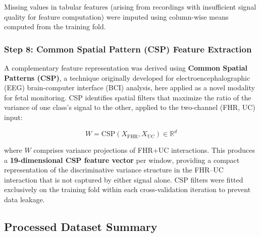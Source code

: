\documentclass[conference]{IEEEtran}
\begin{document}
Missing values in tabular features (arising from recordings with insufficient
signal quality for feature computation) were imputed using column-wise means
computed from the training fold.

\subsubsection{Step 8: Common Spatial Pattern (CSP) Feature Extraction}

A complementary feature representation was derived using \textbf{Common
Spatial Patterns (CSP)}, a technique originally developed for
electroencephalographic (EEG) brain-computer interface (BCI) analysis, here
applied as a novel modality for fetal monitoring. CSP identifies spatial
filters that maximize the ratio of the variance of one class's signal to the
other, applied to the two-channel (FHR, UC) input:

\begin{equation}
    W = \text{CSP}(X_\text{FHR}, X_\text{UC}) \in \mathbb{R}^{d}
\end{equation}

where $W$ comprises variance projections of FHR+UC interactions. This
produces a \textbf{19-dimensional CSP feature vector} per window, providing
a compact representation of the discriminative variance structure in the
FHR–UC interaction that is not captured by either signal alone.
CSP filters were fitted exclusively on the training fold within each
cross-validation iteration to prevent data leakage.

\subsection{Processed Dataset Summary}

\begin{table}[htbp]
\caption{Processed Dataset Specifications for NeuroFetal AI Training}
\label{tab:dataset_spec}
\centering
{}
\end{table}
\end{document}
